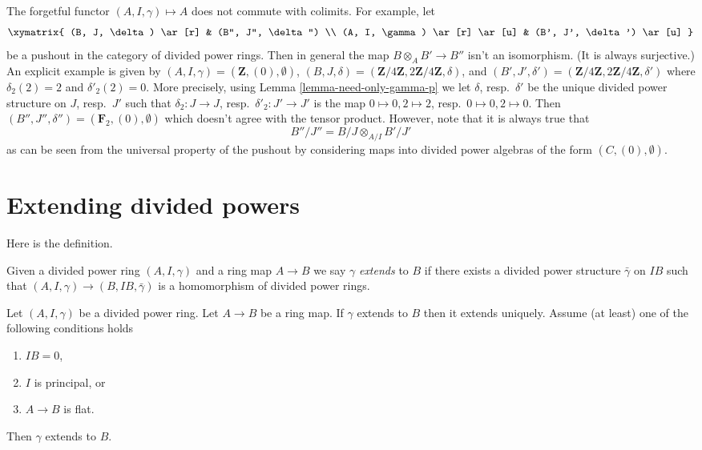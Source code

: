 \begin{remark}
\label{remark-forgetful}
The forgetful functor $(A, I, \gamma) \mapsto A$ does not commute with
colimits. For example, let
$$
\xymatrix{
(B, J, \delta) \ar[r] & (B'', J'', \delta'') \\
(A, I, \gamma) \ar[r] \ar[u] & (B', J', \delta') \ar[u]
}
$$
be a pushout in the category of divided power rings.
Then in general the map $B \otimes_A B' \to B''$ isn't an
isomorphism. (It is always surjective.)
An explicit example is given by
$(A, I, \gamma) = (\mathbf{Z}, (0), \emptyset)$,
$(B, J, \delta) = (\mathbf{Z}/4\mathbf{Z}, 2\mathbf{Z}/4\mathbf{Z}, \delta)$,
and
$(B', J', \delta') =
(\mathbf{Z}/4\mathbf{Z}, 2\mathbf{Z}/4\mathbf{Z}, \delta')$
where $\delta_2(2) = 2$ and $\delta'_2(2) = 0$.
More precisely, using Lemma \ref{lemma-need-only-gamma-p}
we let $\delta$, resp.\ $\delta'$ be the unique
divided power structure on $J$, resp.\ $J'$ such that
$\delta_2 : J \to J$, resp.\ $\delta'_2 : J' \to J'$
is the map $0 \mapsto 0, 2 \mapsto 2$, resp.\ $0 \mapsto 0, 2 \mapsto 0$.
Then $(B'', J'', \delta'') = (\mathbf{F}_2, (0), \emptyset)$
which doesn't agree with the tensor product. However, note that it is always
true that
$$
B''/J'' = B/J \otimes_{A/I} B'/J'
$$
as can be seen from the universal property of the pushout by considering
maps into divided power algebras of the form $(C, (0), \emptyset)$.
\end{remark}


\section{Extending divided powers}
\label{section-extend}

\noindent
Here is the definition.

\begin{definition}
\label{definition-extends}
Given a divided power ring $(A, I, \gamma)$ and a ring map
$A \to B$ we say $\gamma$ {\it extends} to $B$ if there exists a
divided power structure $\bar \gamma$ on $IB$ such that
$(A, I, \gamma) \to (B, IB, \bar\gamma)$ is a homomorphism of
divided power rings.
\end{definition}

\begin{lemma}
\label{lemma-gamma-extends}
Let $(A, I, \gamma)$ be a divided power ring.
Let $A \to B$ be a ring map.
If $\gamma$ extends to $B$ then it extends uniquely.
Assume (at least) one of the following conditions holds
\begin{enumerate}
\item $IB = 0$,
\item $I$ is principal, or
\item $A \to B$ is flat.
\end{enumerate}
Then $\gamma$ extends to $B$.
\end{lemma}


